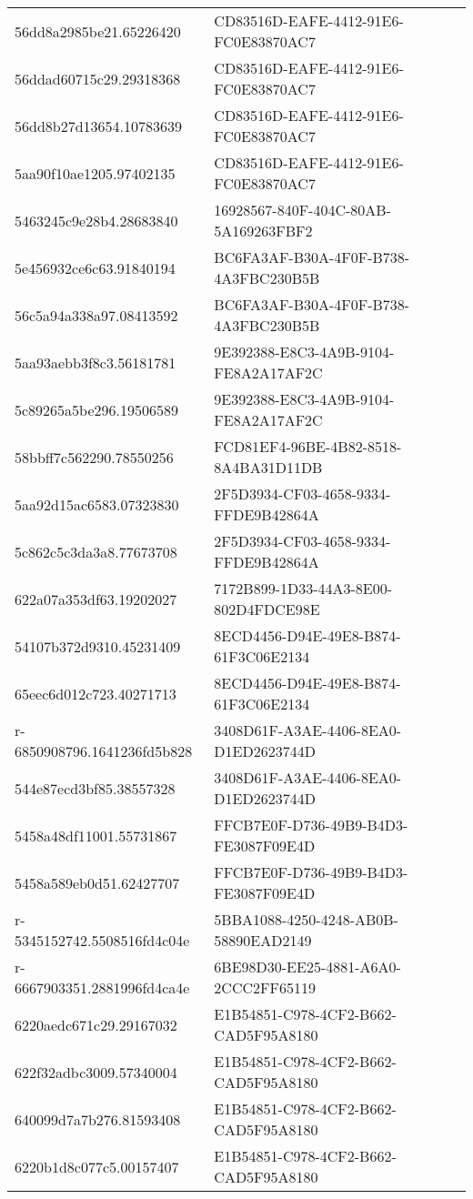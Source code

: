 \begin{tabular}{ll}
56dd8a2985be21.65226420 & CD83516D-EAFE-4412-91E6-FC0E83870AC7 \\
56ddad60715c29.29318368 & CD83516D-EAFE-4412-91E6-FC0E83870AC7 \\
56dd8b27d13654.10783639 & CD83516D-EAFE-4412-91E6-FC0E83870AC7 \\
5aa90f10ae1205.97402135 & CD83516D-EAFE-4412-91E6-FC0E83870AC7 \\
5463245c9e28b4.28683840 & 16928567-840F-404C-80AB-5A169263FBF2 \\
5e456932ce6c63.91840194 & BC6FA3AF-B30A-4F0F-B738-4A3FBC230B5B \\
56c5a94a338a97.08413592 & BC6FA3AF-B30A-4F0F-B738-4A3FBC230B5B \\
5aa93aebb3f8c3.56181781 & 9E392388-E8C3-4A9B-9104-FE8A2A17AF2C \\
5c89265a5be296.19506589 & 9E392388-E8C3-4A9B-9104-FE8A2A17AF2C \\
58bbff7c562290.78550256 & FCD81EF4-96BE-4B82-8518-8A4BA31D11DB \\
5aa92d15ac6583.07323830 & 2F5D3934-CF03-4658-9334-FFDE9B42864A \\
5c862c5c3da3a8.77673708 & 2F5D3934-CF03-4658-9334-FFDE9B42864A \\
622a07a353df63.19202027 & 7172B899-1D33-44A3-8E00-802D4FDCE98E \\
54107b372d9310.45231409 & 8ECD4456-D94E-49E8-B874-61F3C06E2134 \\
65eec6d012c723.40271713 & 8ECD4456-D94E-49E8-B874-61F3C06E2134 \\
r-6850908796.1641236fd5b828 & 3408D61F-A3AE-4406-8EA0-D1ED2623744D \\
544e87ecd3bf85.38557328 & 3408D61F-A3AE-4406-8EA0-D1ED2623744D \\
5458a48df11001.55731867 & FFCB7E0F-D736-49B9-B4D3-FE3087F09E4D \\
5458a589eb0d51.62427707 & FFCB7E0F-D736-49B9-B4D3-FE3087F09E4D \\
r-5345152742.5508516fd4c04e & 5BBA1088-4250-4248-AB0B-58890EAD2149 \\
r-6667903351.2881996fd4ca4e & 6BE98D30-EE25-4881-A6A0-2CCC2FF65119 \\
6220aedc671c29.29167032 & E1B54851-C978-4CF2-B662-CAD5F95A8180 \\
622f32adbc3009.57340004 & E1B54851-C978-4CF2-B662-CAD5F95A8180 \\
640099d7a7b276.81593408 & E1B54851-C978-4CF2-B662-CAD5F95A8180 \\
6220b1d8c077c5.00157407 & E1B54851-C978-4CF2-B662-CAD5F95A8180 \\

\end{tabular}
